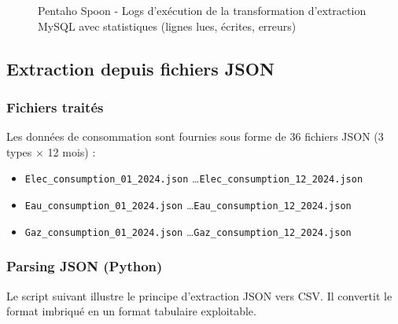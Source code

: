 \documentclass[12pt,a4paper]{report}
\begin{document}
\begin{figure}[H]
    \centering
    \caption{Pentaho Spoon - Logs d'exécution de la transformation d'extraction MySQL avec statistiques (lignes lues, écrites, erreurs)}
    \label{fig:pentaho_extraction_logs}
\end{figure}

\subsection{Extraction depuis fichiers JSON}

\subsubsection{Fichiers traités}

Les données de consommation sont fournies sous forme de 36 fichiers JSON (3 types $\times$ 12 mois) :

\begin{itemize}
    \item \texttt{Elec\_consumption\_01\_2024.json} \ldots \texttt{Elec\_consumption\_12\_2024.json}
    \item \texttt{Eau\_consumption\_01\_2024.json} \ldots \texttt{Eau\_consumption\_12\_2024.json}
    \item \texttt{Gaz\_consumption\_01\_2024.json} \ldots \texttt{Gaz\_consumption\_12\_2024.json}
\end{itemize}

\subsubsection{Parsing JSON (Python)}

Le script suivant illustre le principe d'extraction JSON vers CSV. Il convertit le format imbriqué en un format tabulaire exploitable.
\end{document}

